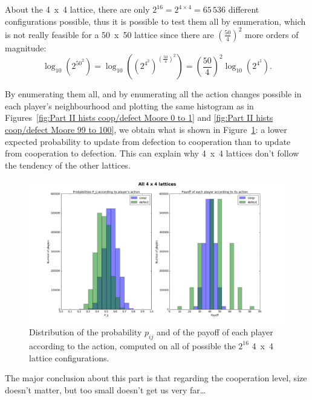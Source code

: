 \documentclass{article}
\begin{document}
About the 4~x~4 lattice, there are only $2^{16} = 2^{4 \times 4} = 65\,536$ different configurations possible,
thus it is possible to test them all by enumeration, which is not really feasible for a 50~x~50 lattice
since there are $\left(\frac {50}4\right)^2$ more orders of magnitude:
\[\log_{10}\left(2^{50^2}\right) = \log_{10}\left(\left(2^{4^2}\right)^{\left(\frac {50}4\right)^2}\right)
= \left(\frac {50}4\right)^2\log_{10}\left(2^{4^2}\right).\]

By enumerating them all, and by enumerating all the action changes possible in each player's neighbourhood
and plotting the same histogram as in Figures~\ref{fig:Part II hists coop/defect Moore 0 to 1} and
\ref{fig:Part II hists coop/defect Moore 99 to 100}, we obtain what is shown in
Figure~\ref{fig:Part II hists coop/defect Moore all 4x4}: a lower expected probability to update from
defection to cooperation than to update from cooperation to defection. This can explain why 4~x~4 lattices
don't follow the tendency of the other lattices.

\begin{figure}[!t]
\hspace{-1.8cm}
\includegraphics[width=1.2\textwidth]{imgs/part2_diff_coop_defect_0_to_1_4x4.png}
\vspace{-1cm}
\caption{Distribution of the probability $p_{ij}$ and of the payoff of each player according to the action,
computed on all of possible the $2^{16}$ 4~x~4 lattice configurations.
\label{fig:Part II hists coop/defect Moore all 4x4}}
\end{figure}

The major conclusion about this part is that regarding the cooperation level, size doesn't matter, but too small
doesn't get us very far\ldots

\newpage
\end{document}
